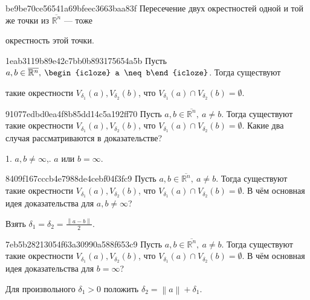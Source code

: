 \begin{note}{be9be70ce56541a69bfeec3663baa83f}
    Пересечение двух окрестностей одной и той же точки из \({ \overline{\mathbb R^{n}} }\) --- тоже \begin{icloze}{1}окрестность этой точки.\end{icloze}
\end{note}

\begin{note}{1eab3119b89e42c7bb0b893175654a5b}
    Пусть \({ a, b \in \overline{\mathbb R^{n}},\: \begin{icloze}{2}a \neq b\end{icloze} }\).
    Тогда существуют \begin{icloze}{1}такие окрестности \({ V_{\delta_1}(a), V_{\delta_2}(b) }\), что \({ V_{\delta_1}(a) \cap V_{\delta_2}(b) = \emptyset }\).\end{icloze}
\end{note}

\begin{note}{91077edbd0ea4f8b85dd14c5a192ff70}
    Пусть \({ a, b \in \overline{\mathbb R^{n}},\: a \neq b }\).
    Тогда существуют такие окрестности \({ V_{\delta_1}(a), V_{\delta_2}(b) }\), что \({ V_{\delta_1}(a) \cap V_{\delta_2}(b) = \emptyset }\).
    Какие два случая рассматриваются в доказательстве?

    \begin{cloze}{1}
        1. \({ a, b \neq \infty }\),. \({ a }\) или \({ b = \infty }\).
    \end{cloze}
\end{note}

\begin{note}{8409f167cccb4e7988de4cebf04f3fc9}
    Пусть \({ a, b \in \overline{\mathbb R^{n}},\: a \neq b }\).
    Тогда существуют такие окрестности \({ V_{\delta_1}(a), V_{\delta_2}(b) }\), что \({ V_{\delta_1}(a) \cap V_{\delta_2}(b) = \emptyset }\).
    В чём основная идея доказательства для \({ a, b \neq \infty }\)?

    \begin{cloze}{1}
        Взять \({ \delta_1 = \delta_2 = \frac{\left\lVert a - b \right\rVert}{2} }\).
    \end{cloze}
\end{note}

\begin{note}{7eb5b28213054f63a30990a588f653c9}
    Пусть \({ a, b \in \overline{\mathbb R^{n}},\: a \neq b }\).
    Тогда существуют такие окрестности \({ V_{\delta_1}(a), V_{\delta_2}(b) }\), что \({ V_{\delta_1}(a) \cap V_{\delta_2}(b) = \emptyset }\).
    В чём основная идея доказательства для \({ b = \infty }\)?

    \begin{cloze}{1}
        Для произвольного \({ \delta_1 > 0 }\) положить \({ \delta_2 = \left\lVert a \right\rVert + \delta_1 }\).
    \end{cloze}
\end{note}

